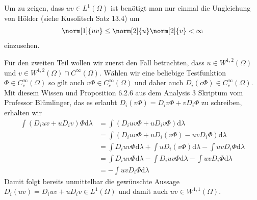 \begin{solution}
    Um zu zeigen, dass $uv\in L^1(\Omega)$ ist benötigt man nur einmal die Ungleichung von Hölder (siehe Kusolitsch Satz 13.4) um
\begin{align*}
    \norm[1]{uv}\leq\norm[2]{u}\norm[2]{v}<\infty
\end{align*}
einzusehen.

Für den zweiten Teil wollen wir zuerst den Fall betrachten, dass $u\in W^{1,2}(\Omega)$ und $v\in W^{1,2}(\Omega)\cap C^\infty(\Omega)$. Wählen wir eine beliebige Testfunktion $\Phi\in C_c^\infty(\Omega)$ so gilt auch $v\Phi\in C_c^\infty(\Omega)$ und daher auch $D_i(c\Phi)\in C_c^\infty(\Omega)$. Mit diesem Wissen und Proposition 6.2.6 aus dem Analysis 3 Skriptum vom Professor Blümlinger, das es erlaubt $D_i(v\Phi)=D_iv\Phi+vD_i\Phi$ zu schreiben, erhalten wir
\begin{align*}
    \int(D_iuv+uD_iv)\Phi\mathrm{d}\lambda&=\int(D_iuv\Phi+uD_iv\Phi)\mathrm{d}\lambda\\
    &=\int(D_iuv\Phi+uD_i(v\Phi)-uvD_i\Phi)\mathrm{d}\lambda\\
    &=\int D_iuv\Phi\mathrm{d}\lambda+\int uD_i(v\Phi)\mathrm{d}\lambda-\int uvD_i\Phi\mathrm{d}\lambda\\
    &=\int D_iuv\Phi\mathrm{d}\lambda-\int D_iuv\Phi\mathrm{d}\lambda-\int uvD_i\Phi \mathrm{d}\lambda\\
    &=-\int uvD_i\Phi \mathrm{d}\lambda
\end{align*}
Damit folgt bereits unmittelbar die gewünschte Aussage $D_i(uv)=D_iuv+uD_iv\in L^1(\Omega)$ und damit auch $uv\in W^{1,1}(\Omega)$.


\end{solution}
